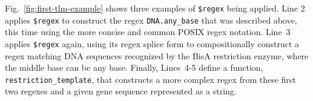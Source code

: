 \documentclass[acmsmall]{acmart}
\newcommand{\li}[1]{\lstinline[basicstyle=\ttfamily\fontsize{9pt}{1em}\selectfont]{#1}}
\begin{document}
Fig.~\ref{fig:first-tlm-example} shows three examples of \li{$regex} being applied.
Line 2 applies \li{$regex} to construct the regex \li{DNA.any_base} that was  described above, this time using the more concise and common POSIX regex notation. Line~3 applies \li{$regex} again, using its regex splice form to compositionally construct a regex matching DNA sequences recognized by the BisA restriction enzyme, where the middle base can be any base. Finally, Lines~4-5 define a function, \li{restriction_template}, that constructs a more complex regex from these first two regexes and a given gene sequence represented as a string.




\end{document}
